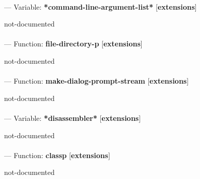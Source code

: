 \paragraph{}
\label{EXTENSIONS:*COMMAND-LINE-ARGUMENT-LIST*}
--- Variable: \textbf{*command-line-argument-list*} [\textbf{extensions}] \textit{}

\begin{adjustwidth}{5em}{5em}
not-documented
\end{adjustwidth}

\paragraph{}
\label{EXTENSIONS:FILE-DIRECTORY-P}
--- Function: \textbf{file-directory-p} [\textbf{extensions}] \textit{}

\begin{adjustwidth}{5em}{5em}
not-documented
\end{adjustwidth}

\paragraph{}
\label{EXTENSIONS:MAKE-DIALOG-PROMPT-STREAM}
--- Function: \textbf{make-dialog-prompt-stream} [\textbf{extensions}] \textit{}

\begin{adjustwidth}{5em}{5em}
not-documented
\end{adjustwidth}

\paragraph{}
\label{EXTENSIONS:*DISASSEMBLER*}
--- Variable: \textbf{*disassembler*} [\textbf{extensions}] \textit{}

\begin{adjustwidth}{5em}{5em}
not-documented
\end{adjustwidth}

\paragraph{}
\label{EXTENSIONS:CLASSP}
--- Function: \textbf{classp} [\textbf{extensions}] \textit{}

\begin{adjustwidth}{5em}{5em}
not-documented
\end{adjustwidth}

